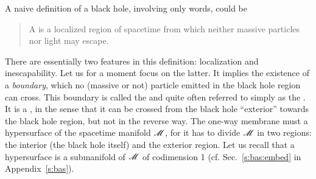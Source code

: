 A naive definition of a black hole, involving only words, could be
\begin{quote}
A  is a localized region of spacetime
from which neither massive particles nor light may escape.
\end{quote}
There are essentially two features in this definition: localization
and inescapability. Let us for a moment focus on the latter.
It implies the existence of a \emph{boundary}, which no
(massive or not) particle emitted in the black hole region can cross.
This boundary is called the
 and
quite often referred to simply as the .
It is a ,
in the sense that it can be crossed from the black hole ``exterior'' towards
the black hole region, but not in the reverse way. The one-way membrane must
a hypersurface of the spacetime manifold $\mathscr{M}$, for it has to divide $\mathscr{M}$ in two regions:
the interior (the black hole itself) and the exterior region.
Let us recall that a hypersurface is a submanifold of $\mathscr{M}$ of codimension 1
(cf. Sec.~\ref{s:bas:embed} in Appendix~\ref{s:bas}).

